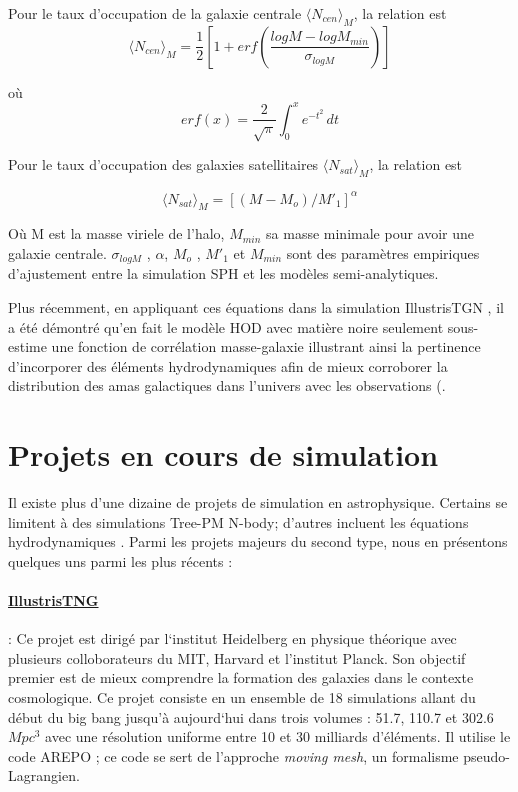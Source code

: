 \documentclass{article}
\begin{document}
Pour le taux d'occupation de la galaxie centrale  $\langle N_{cen}\rangle_M$, la relation est 
\begin{equation}
    \langle N_{cen}\rangle_M = \frac{1}{2} [ 1+ erf(\frac{log M - log M_{min}}{\sigma_{log M}})]
\end{equation}

où
\begin{equation}
erf(x) = \frac{2}{\sqrt{\pi}} \int_{0}^{x} e^{-t^2} \,dt
\end{equation}

Pour le taux d'occupation des galaxies satellitaires $\langle N_{sat} \rangle_M $, la relation est 

\begin{equation}
    \langle N_{sat} \rangle_M = [(M - M_o)/M'_1]^\alpha
\end{equation}

Où M est la masse viriele de l'halo, $M_{min}$ sa masse minimale pour avoir une galaxie centrale.  $\sigma_{log M}$ , $\alpha$, $M_o$ , $M'_1$ et $M_{min}$ sont des paramètres empiriques d'ajustement entre la simulation SPH et les modèles semi-analytiques.


Plus récemment, en appliquant ces équations dans la simulation IllustrisTGN , il a été démontré qu'en fait le modèle HOD avec matière noire seulement sous-estime une fonction de corrélation masse-galaxie   illustrant ainsi la pertinence d’incorporer des éléments hydrodynamiques afin de mieux corroborer la distribution des amas galactiques dans l’univers avec les observations (\cite{Hadzhiyska_2020}.


\section{Projets en cours de simulation}

Il existe plus d'une dizaine de projets de simulation en astrophysique. Certains se limitent à des simulations  Tree-PM N-body; d'autres incluent les équations hydrodynamiques \cite{Vogelsberger2020}. Parmi les projets majeurs du second type, nous en présentons quelques uns parmi les plus récents :

\paragraph{\href{https://www.tng-project.org/}{IllustrisTNG}} \citep{Illustris}: Ce projet est dirigé par l`institut  Heidelberg en physique théorique avec plusieurs colloborateurs du MIT, Harvard et l’institut Planck. Son objectif premier est de mieux comprendre la formation des galaxies dans le contexte cosmologique. Ce projet consiste en un ensemble de 18 simulations allant du début du big bang jusqu’à aujourd`hui dans trois volumes : 51.7, 110.7 et 302.6 $Mpc^3$ avec une résolution uniforme entre 10 et 30 milliards d’éléments. Il utilise le code AREPO \citep{AREPO}; ce code se sert de l'approche \textit{moving mesh}, un formalisme pseudo-Lagrangien. 
\end{document}
